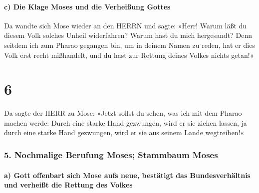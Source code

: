 \hypertarget{c-die-klage-moses-und-die-verheiuxdfung-gottes}{%
\paragraph{c) Die Klage Moses und die Verheißung
Gottes}\label{c-die-klage-moses-und-die-verheiuxdfung-gottes}}

 Da wandte sich Mose wieder an den HERRN und sagte:
»Herr! Warum läßt du diesem Volk solches Unheil widerfahren? Warum hast
du mich hergesandt?  Denn seitdem ich zum Pharao gegangen
bin, um in deinem Namen zu reden, hat er dies Volk erst recht
mißhandelt, und du hast zur Rettung deines Volkes nichts getan!«

\hypertarget{section-5}{%
\section{6}\label{section-5}}

 Da sagte der HERR zu Mose: »Jetzt sollst du sehen, was
ich mit dem Pharao machen werde: Durch eine starke Hand gezwungen, wird
er sie ziehen lassen, ja durch eine starke Hand gezwungen, wird er sie
aus seinem Lande wegtreiben!«

\hypertarget{nochmalige-berufung-moses-stammbaum-moses}{%
\subsubsection{5. Nochmalige Berufung Moses; Stammbaum
Moses}\label{nochmalige-berufung-moses-stammbaum-moses}}

\hypertarget{a-gott-offenbart-sich-mose-aufs-neue-bestuxe4tigt-das-bundesverhuxe4ltnis-und-verheiuxdft-die-rettung-des-volkes}{%
\paragraph{a) Gott offenbart sich Mose aufs neue, bestätigt das
Bundesverhältnis und verheißt die Rettung des
Volkes}\label{a-gott-offenbart-sich-mose-aufs-neue-bestuxe4tigt-das-bundesverhuxe4ltnis-und-verheiuxdft-die-rettung-des-volkes}}

